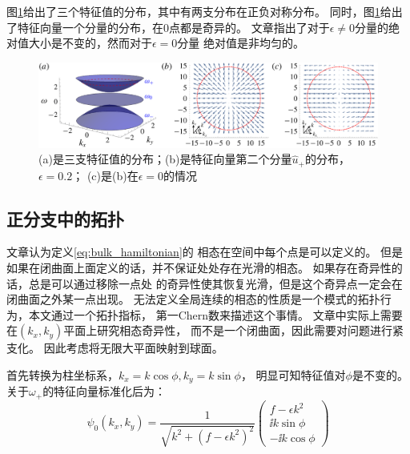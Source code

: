 \documentclass[UTF8,zihao=5]{ctexart} %
\begin{document}
图\ref{fig:1}给出了三个特征值的分布，其中有两支分布在正负对称分布。
同时，图\ref{fig:1}给出了特征向量一个分量的分布，在0点都是奇异的。
文章指出了对于$\epsilon\neq0$分量的绝对值大小是不变的，然而对于$\epsilon=0$分量
绝对值是非均匀的。

\begin{figure}[H]
    \centering
    \includegraphics[width=16cm]{fig1.png}  %
    \caption{(a)是三支特征值的分布；(b)是特征向量第二个分量$\hat{u}_+$的分布，$\epsilon=0.2$；
        (c)是(b)在$\epsilon=0$的情况}
    \label{fig:1}
\end{figure}

\subsection{正分支中的拓扑}

文章认为定义\eqref{eq:bulk_hamiltonian}的
相态在空间中每个点是可以定义的。
但是如果在闭曲面上面定义的话，并不保证处处存在光滑的相态。
如果存在奇异性的话，总是可以通过移除一点处
的奇异性使其恢复光滑，但是这个奇异点一定会在闭曲面之外某一点出现。
无法定义全局连续的相态的性质是一个模式的拓扑行为，本文通过一个拓扑指标，
第一Chern数来描述这个事情。
文章中实际上需要在$(k_x,k_y)$平面上研究相态奇异性，
而不是一个闭曲面，因此需要对问题进行紧支化。
因此考虑将无限大平面映射到球面。

首先转换为柱坐标系，$k_x=k\cos{\phi}, k_y=k\sin{\phi}$，
明显可知特征值对$\phi$是不变的。
关于$\omega_{+}$的特征向量标准化后为：
\begin{equation}
    \psi_0(k_x,k_y) = \dfrac{1}{\sqrt{k^2 +(f-\epsilon k^2)^2}} \begin{pmatrix}
        f-\epsilon  k^2 \\ \ii k \sin \phi \\ -\ii k \cos \phi
    \end{pmatrix}
\end{equation}
\end{document}
